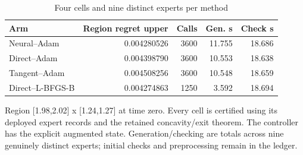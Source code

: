 \begin{table}[htbp]\centering\small
\caption{Four cells and nine distinct experts per method}\label{tab:r24multi}
\begin{tabular}{lrrrr}\toprule
Arm & Region regret upper & Calls & Gen. s & Check s\\\midrule
Neural--Adam & 0.004280526 & 3600 & 11.755 & 18.686\\
Direct--Adam & 0.004398790 & 3600 & 10.553 & 18.638\\
Tangent--Adam & 0.004508256 & 3600 & 10.548 & 18.659\\
Direct--L-BFGS-B & 0.004274863 & 1250 & 3.592 & 18.694\\
\bottomrule\end{tabular}
\par\smallskip\begin{minipage}{.97\textwidth}\footnotesize Region [1.98,2.02] x [1.24,1.27] at time zero. Every cell is certified using its deployed expert records and the retained concavity/exit theorem. The controller has the explicit augmented state. Generation/checking are totals across nine genuinely distinct experts; initial checks and preprocessing remain in the ledger.\end{minipage}
\end{table}
